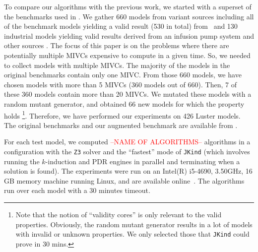 To compare our algorithms with the previous work, we started with a superset of the benchmarks used in \cite{Ghass17AllIVCs}. We gather 660 models from variant sources including all of the benchmark models yielding a valid result (530 in total) from~\cite{Hagen08:FMCAD, piskac2016} and 130 industrial models yielding valid results derived from an infusion pump system \cite{hilt2013} and other sources \cite{piskac2016, NFM2015:backes}. 
The focus of this paper is on the problems where there are potentially multiple MIVCs expensive to compute in a given time. So, we needed to collect models with multiple MIVCs. The majority of the models in the original benchmarks contain only one MIVC. From those 660 models, we have chosen models with more than 5 MIVCs (360 models out of 660). Then, 7 of these 360 models contain more than 20 MIVCs. We mutated these models with a random mutant generator, and obtained 66 new models for which the property holds \footnote{Note that the notion of ``validity cores'' is only relevant to the valid properties. Obviously, the random mutant generator results in a lot of models with invalid or unknown properties. We only selected those that \texttt{JKind} could prove in 30 mins.}. 
Therefore, we have performed our experiments on 426 Luster models. The original benchmarks and our augmented benchmark are available from \cite{bench}.

For each test model, we computed \textcolor{red}{--NAME OF ALGORITHMS--} algorithms in a configuration with the \texttt{Z3} solver and the ``fastest'' mode of \texttt{JKind} (which involves running the $k$-induction and PDR engines in parallel and terminating when a solution is found). The experiments were run on an  Intel(R) i5-4690, 3.50GHz, 16 GB memory machine running Linux, and are available online~\cite{expr}.
The algorithms run over each model with a 30 minutes timeout. 

